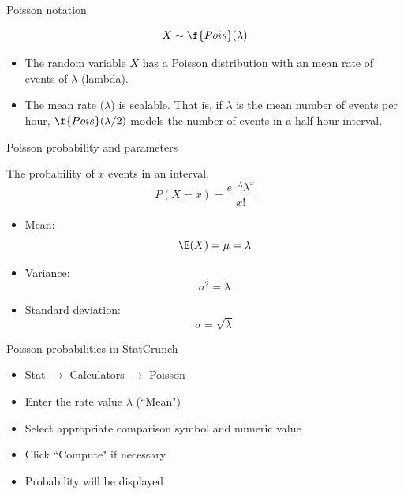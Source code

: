 \documentclass[xcolor=table, handout]{beamer}
\begin{document}
\begin{frame}{Poisson notation}
\begin{block}{}
\[X \sim \f{Pois}(\lambda)\]
\begin{itemize}
\pause\item The random variable $X$ has a Poisson distribution with an mean rate of events of $\lambda$ (lambda).
\pause\item The mean rate ($\lambda$) is scalable. That is, if $\lambda$ is the mean number of events per hour, $\f{Pois}(\lambda/2)$ models the number of events in a half hour interval.
\end{itemize}
\end{block}
\end{frame}

\begin{frame}{Poisson probability and parameters}
\begin{block}{}
The probability of $x$ events in an interval,
\[P(X=x) = \frac{e^{-\lambda}\lambda^x}{x!}\]
\begin{itemize}
\vspace*{-\baselineskip}\pause\item Mean: \[\E(X) = \mu = \lambda\]
\vspace*{-\baselineskip}\pause\item Variance: \[\sigma^2 = \lambda\]
\vspace*{-\baselineskip}\pause\item Standard deviation: \[\sigma = \sqrt \lambda \]
\end{itemize}
\end{block}
\end{frame}

\begin{frame}{Poisson probabilities in StatCrunch}
\begin{block}{}
\begin{itemize}
\item Stat $\to$ Calculators $\to$ Poisson
\item Enter the rate value $\lambda$ (``Mean")
\item Select appropriate comparison symbol and numeric value
\item Click ``Compute" if necessary
\item Probability will be displayed
\end{itemize}
\end{block}
\end{frame}
\end{document}
